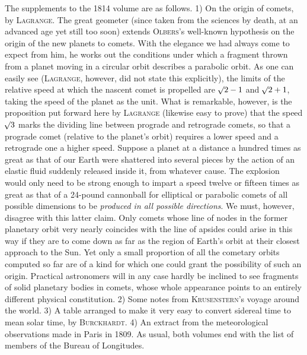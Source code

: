 The supplements to the 1814 volume are as follows. 1) On the origin of comets, by \textsc{Lagrange}. The great geometer (since taken from the sciences by death, at an advanced age yet still too soon) extends \textsc{Olbers}'s well-known hypothesis on the origin of the new planets to comets. With the elegance we had always come to expect from him, he works out the conditions under which a fragment thrown from a planet moving in a circular orbit describes a parabolic orbit. As one can easily see (\textsc{Lagrange}, however, did not state this explicitly), the limits of the relative speed at which the nascent comet is propelled are $\mathord{{}^{}\!\surd}2-1$ and $\mathord{{}^{}\!\surd}2+1$, taking the speed of the planet as the unit. What is remarkable, however, is the proposition put forward here by \textsc{Lagrange} (likewise easy to prove) that the speed $\mathord{{}^{}\!\surd}3$ marks the dividing line between prograde and retrograde comets, so that a prograde comet (relative to the planet's orbit) requires a lower speed and a retrograde one a higher speed. Suppose a planet at a distance a hundred times as great as that of our Earth were shattered into several pieces by the action of an elastic fluid suddenly released inside it, from whatever cause. The explosion would only need to be strong enough to impart a speed twelve or fifteen times as great as that of a 24-pound cannonball for elliptical or parabolic comets of all possible dimensions to be \emph{produced in all possible directions}. We must, however, disagree with this latter claim. Only comets whose line of nodes in the former planetary orbit very nearly coincides with the line of apsides could arise in this way if they are to come down as far as the region of Earth's orbit at their closest approach to the Sun. Yet only a small proportion of all the cometary orbits computed so far are of a kind for which one could grant the possibility of such an origin. Practical astronomers will in any case hardly be inclined to see fragments of solid planetary bodies in comets, whose whole appearance points to an entirely different physical constitution. 2) Some notes from \textsc{Krusenstern}'s voyage around the world. 3) A table arranged to make it very easy to convert sidereal time to mean solar time, by \textsc{Burckhardt}. 4) An extract from the meteorological observations made in Paris in 1809. As usual, both volumes end with the list of members of the Bureau of Longitudes.
